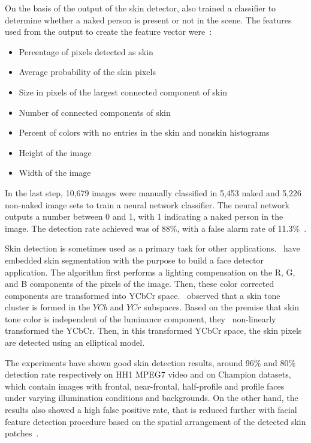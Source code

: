 On the basis of the output of the skin detector, \citet{jones:02} also trained a classifier to determine whether a naked person is present or not in the scene. The features used from the output to create the feature vector were~\citep{jones:02}:
\begin{itemize}
    \item Percentage of pixels detected as skin
    \item Average probability of the skin pixels
    \item Size in pixels of the largest connected component of skin
    \item Number of connected components of skin
    \item Percent of colors with no entries in the skin and nonskin histograms
    \item Height of the image
    \item Width of the image
\end{itemize}

In the last step, 10,679 images were manually classified in 5,453 naked and 5,226 non-naked image sets to train a neural network classifier. The neural network outputs a number between 0 and 1, with 1 indicating a naked person in the image. The detection rate achieved was of 88\%, with a false alarm rate of 11.3\%~\citep{jones:02}.

Skin detection is sometimes used as a primary task for other applications. \citet{hsu:02}~have embedded skin segmentation with the purpose to build a face detector application. The algorithm first performs a lighting compensation on the R, G, and B components of the pixels of the image. Then, these color corrected components are transformed into YCbCr space. \citet{hsu:02}~observed that a skin tone cluster is formed in the $YCb$ and $YCr$ subspaces. Based on the premise that skin tone color is independent of the luminance component, they~\citep{hsu:02} non-linearly transformed the YCbCr. Then, in this transformed YCbCr space, the skin pixels are detected using an elliptical model.

The experiments have shown good skin detection results, around 96\% and 80\% detection rate respectively on HH1 MPEG7 video and on Champion datasets, which contain images with frontal, near-frontal, half-profile and profile faces under varying illumination conditions and backgrounds. On the other hand, the results also showed a high false positive rate, that is reduced further with facial feature detection procedure based on the spatial arrangement of the detected skin patches~\citep{hsu:02}.

